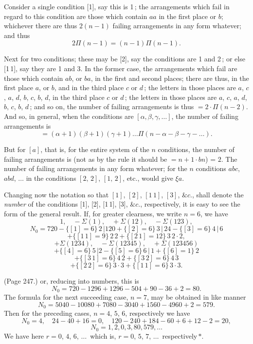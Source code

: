 \documentclass[11pt,a4paper]{article}
\theoremstyle{plain}
\theoremstyle{definition}
\begin{document}
Consider a single condition [1], say this is 1\,; the arrangements which fail in regard to this condition are those which contain $a a$ in the first place or $b$; whichever there are thus $2 (n - 1)$ failing arrangements in any form whatever; and thus
\[
2 \Pi (n - 1) = (n - 1) \Pi(n - 1).
\]

Next for two conditions; these may be [2], say the conditions are 1 and 2\,; or else [1\,1], say they are 1 and 3. In the former case, the arrangements which fail are those which contain $ab$, or $ba$, in the first and second places; there are thus, in the first place $a$, or $b$, and in the third place $c$ or $d$\,; the letters in those places are $a$, $c$, $a$, $d$, $b$, $c$, $b$, $d$, in the third place $c$ or $d$\,; the letters in those places are $a$, $c$, $a$, $d$, $b$, $c$, $b$, $d$\,; and so on, the number of failing arrangements is thus $= 2\cdot \Pi (n - 2)$. And so, in general, when the conditions are $[\alpha, \beta, \gamma, \ldots]$, the number of failing arrangements is
\[
= ( \alpha + 1)(\beta + 1)(\gamma + 1)\ldots \Pi (n - \alpha - \beta - \gamma - \ldots).
\]

But for $[a]$, that is, for the entire system of the $n$ conditions, the number of failing arrangements is (not as by the rule it should be $= n + 1\cdot bn$) = $2$. The number of failing arrangements in any form whatever; for the $n$ conditions $abc$, $abd$, $\ldots$ in the conditions $[2,\,2]$, $[1,\,2]$, etc., would give $\xi a$.

Changing now the notation so that $[1]$, $[2]$, $[1\,1]$, $[3]$, $\&c$., shall denote the \emph{number} of the conditions [1], [2], [1\,1], [3], $\&c$., respectively, it is easy to see the form of the general result. If, for greater clearness, we write $n = 6$, we have
\[
1, \quad - \Sigma(1), \quad + \Sigma(12), \quad - \Sigma(123),
\]
\[
N_0 = 720 - \{[1] = 6\}\,2\,| 120 + \{[2] = 6\}\,3\,|\,24 - \{[3] = 6\}\,4\,|\,6
\]
\[
+ \{[1\,1] = 9\}\,2\,2 + \{[2\,1] = 12\}\,3\,2\cdot 2,
\]
\[
+ \Sigma(1234), \quad - \Sigma(12345), \quad + \Sigma(123456)
\]
\[
+ \{[4] = 6\}\,5\,| 2 - \{[5] = 6\}\,6\,|\,1 + \{[6] = 1\}\,2
\]
\[
+ \{[3\,1] = 6\}\,4\,2 + \{[3\,2] = 6\}\,4\,3
\]
\[
+ \{[2\,2] = 6\}\,3\cdot 3 + \{[1\,1] = 6\}\,3\cdot 3.
\]

\medskip

\noindent (Page 247.) or, reducing into numbers, this is
\[
N_0 = 720 - 1296 + 1296 - 504 + 90 - 36 + 2 = 80.
\]
The formula for the next succeeding case, $n = 7$, may be obtained in like manner
\[
N_0 = 5040 - 10080 + 7080 - 3040 + 1560 - 4960 + 2 = 579.
\]
Then for the preceding cases, $n = 4$, $5$, $6$, respectively we have
\[
N_0 = 4, \quad 24 - 40 + 16 = 0, \quad 120 - 240 + 184 - 60 + 6 + 12 - 2 = 20,
\]
\[
N_0 = 1, 2, 0, 3, 80, 579, \ldots
\]
We have here $r = 0$, $4$, $6$, $\ldots$\ which is, $r = 0$, $5$, $7$, $\ldots$\ respectively\,$\ast$.
\end{document}
